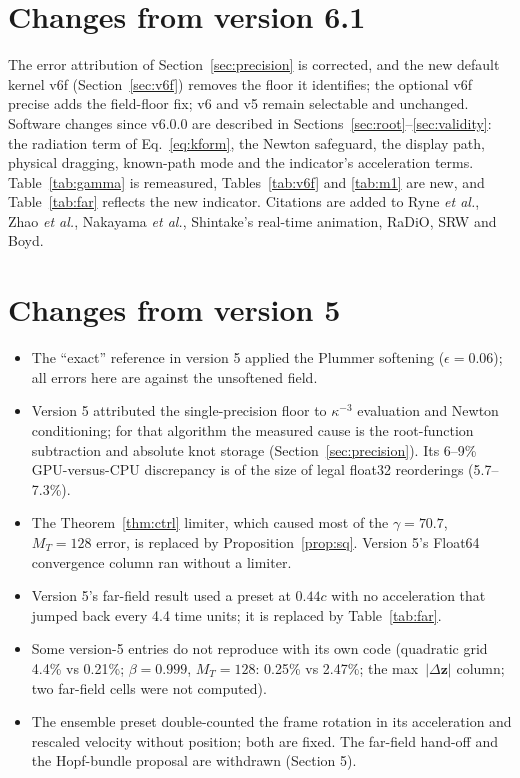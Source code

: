 \documentclass[11pt, a4paper]{article}
\begin{document}
\section{Changes from version 6.1}\label{sec:changes61}
The error attribution of Section~\ref{sec:precision} is corrected, and the new default kernel v6f (Section~\ref{sec:v6f}) removes the floor it identifies; the optional v6f precise adds the field-floor fix; v6 and v5 remain selectable and unchanged. Software changes since v6.0.0 are described in Sections~\ref{sec:root}--\ref{sec:validity}: the radiation term of Eq.~\eqref{eq:kform}, the Newton safeguard, the display path, physical dragging, known-path mode and the indicator's acceleration terms. Table~\ref{tab:gamma} is remeasured, Tables~\ref{tab:v6f} and \ref{tab:m1} are new, and Table~\ref{tab:far} reflects the new indicator. Citations are added to Ryne \textit{et al.}, Zhao \textit{et al.}, Nakayama \textit{et al.}, Shintake's real-time animation, RaDiO, SRW and Boyd.

\section{Changes from version 5}\label{sec:changes5}
\begin{itemize}
    \item The ``exact'' reference in version 5 applied the Plummer softening ($\epsilon = 0.06$); all errors here are against the unsoftened field.
    \item Version 5 attributed the single-precision floor to $\kappa^{-3}$ evaluation and Newton conditioning; for that algorithm the measured cause is the root-function subtraction and absolute knot storage (Section~\ref{sec:precision}). Its 6--9\% GPU-versus-CPU discrepancy is of the size of legal float32 reorderings (5.7--7.3\%).
    \item The Theorem~\ref{thm:ctrl} limiter, which caused most of the $\gamma = 70.7$, $M_T = 128$ error, is replaced by Proposition~\ref{prop:sq}. Version 5's Float64 convergence column ran without a limiter.
    \item Version 5's far-field result used a preset at $0.44c$ with no acceleration that jumped back every 4.4 time units; it is replaced by Table~\ref{tab:far}.
    \item Some version-5 entries do not reproduce with its own code (quadratic grid 4.4\% vs 0.21\%; $\beta = 0.999$, $M_T = 128$: 0.25\% vs 2.47\%; the max~$|\Delta\mathbf{z}|$ column; two far-field cells were not computed).
    \item The ensemble preset double-counted the frame rotation in its acceleration and rescaled velocity without position; both are fixed. The far-field hand-off and the Hopf-bundle proposal are withdrawn (Section 5).
\end{itemize}
\end{document}
